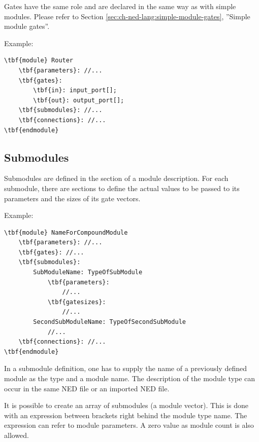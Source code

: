 Gates have the same role and are declared in the same way
as with simple modules. Please refer to Section
\ref{sec:ch-ned-lang:simple-module-gates}, ''Simple module gates''.


Example:
\begin{Verbatim}[commandchars=\\\{\}]
\tbf{module} Router
    \tbf{parameters}: //...
    \tbf{gates}:
        \tbf{in}: input_port[];
        \tbf{out}: output_port[];
    \tbf{submodules}: //...
    \tbf{connections}: //...
\tbf{endmodule}
\end{Verbatim}





\subsection{Submodules}


Submodules are defined in the
 section of a
module description. For each submodule, there are sections to define
the actual values to be passed to its parameters and the sizes of its
gate vectors.

Example:

\begin{Verbatim}[commandchars=\\\{\}]
\tbf{module} NameForCompoundModule
    \tbf{parameters}: //...
    \tbf{gates}: //...
    \tbf{submodules}:
        SubModuleName: TypeOfSubModule
            \tbf{parameters}: 
                //...
            \tbf{gatesizes}:
                //...
        SecondSubModuleName: TypeOfSecondSubModule
            //...
    \tbf{connections}: //...
\tbf{endmodule}
\end{Verbatim}

In a submodule definition, one has to supply the name of a previously
defined module as the type and a module name. The description of the
module type can occur in the same NED file or an imported NED file.




It is possible to create an array of
submodules (a module
vector).  This is done with an expression between
brackets right behind the module type name. The expression can refer
to module parameters.  A zero value as module count is also allowed.

